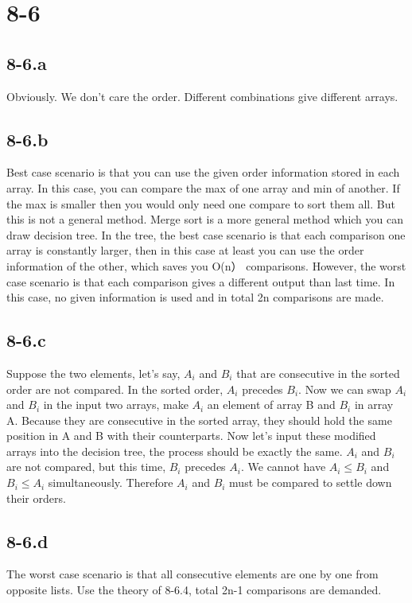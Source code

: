 \documentclass{article}
\begin{document}
	 \section*{8-6}
	 \subsection*{8-6.a}
	 Obviously. We don't care the order. Different combinations give different arrays.
	 \subsection*{8-6.b}
	 Best case scenario is that you can use the given order information stored in each array. In this case, you can compare the max of one array and min of another. If the max is smaller then you would only need one compare to sort them all. But this is not a general method. Merge sort is a more general method which you can draw decision tree. In the tree, the best case scenario is that each comparison one array is constantly larger, then in this case at least you can use the order information of the other, which saves you O(n） comparisons. However, the worst case scenario is that each comparison gives a different output than last time. In this case, no given information is used and in total 2n comparisons are made. 
	 \subsection*{8-6.c}
	 Suppose the two elements, let's say, $A_i$ and $B_i$ that are consecutive in the sorted order are not compared. In the sorted order, $A_i$ precedes $B_i$. Now we can swap $A_i$ and $B_i$ in the input two arrays, make $A_i$ an element of array B and $B_i$ in array A. Because they are consecutive in the sorted array, they should hold the same position in A and B with their counterparts. Now let's input these modified arrays into the decision tree, the process should be exactly the same. $A_i$ and $B_i$ are not compared, but this time, $B_i$ precedes $A_i$. We cannot have $A_i \leq B_i$ and $B_i \leq A_i$ simultaneously. Therefore $A_i$ and $B_i$ must be compared to settle down their orders.
	 \subsection*{8-6.d}
	 The worst case scenario is that all consecutive elements are one by one from opposite lists. Use the theory of 8-6.4, total 2n-1 comparisons are demanded.
\end{document}
